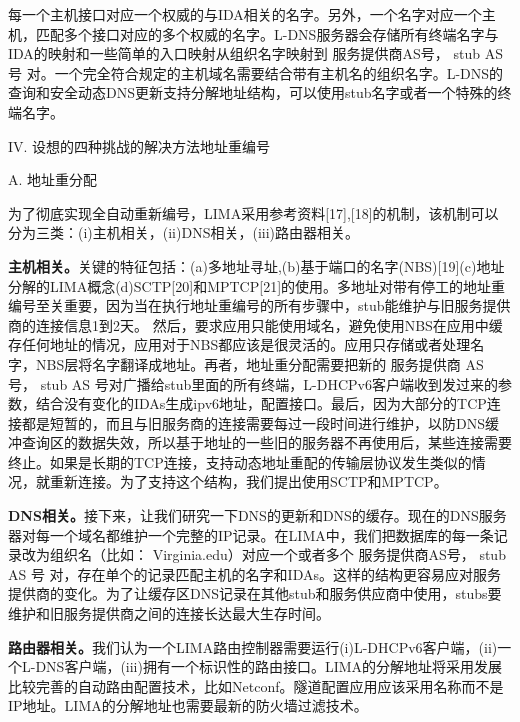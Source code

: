 \par 每一个主机接口对应一个权威的与IDA相关的名字。另外，一个名字对应一个主机，匹配多个接口对应的多个权威的名字。L-DNS服务器会存储所有终端名字与IDA的映射和一些简单的入口映射从组织名字映射到 { 服务提供商AS号， stub AS 号 }对。一个完全符合规定的主机域名需要结合带有主机名的组织名字。L-DNS的查询和安全动态DNS更新支持分解地址结构，可以使用stub名字或者一个特殊的终端名字。
\begin{center}
IV.	设想的四种挑战的解决方法地址重编号
\end{center}
\begin{flushleft}
A.	地址重分配 
\end{flushleft}
\par 为了彻底实现全自动重新编号，LIMA采用参考资料[17],[18]的机制，该机制可以分为三类：(i)主机相关，(ii)DNS相关，(iii)路由器相关。
\begin{flushleft}
\par \textbf{主机相关。}关键的特征包括：(a)多地址寻址,(b)基于端口的名字(NBS)[19](c)地址分解的LIMA概念(d)SCTP[20]和MPTCP[21]的使用。多地址对带有停工的地址重编号至关重要，因为当在执行地址重编号的所有步骤中，stub能维护与旧服务提供商的连接信息1到2天。 然后，要求应用只能使用域名，避免使用NBS在应用中缓存任何地址的情况，应用对于NBS都应该是很灵活的。应用只存储或者处理名字，NBS层将名字翻译成地址。再者，地址重分配需要把新的 { 服务提供商 AS 号， stub AS 号}对广播给stub里面的所有终端，L-DHCPv6客户端收到发过来的参数，结合没有变化的IDAs生成ipv6地址，配置接口。最后，因为大部分的TCP连接都是短暂的，而且与旧服务商的连接需要每过一段时间进行维护，以防DNS缓冲查询区的数据失效，所以基于地址的一些旧的服务器不再使用后，某些连接需要终止。如果是长期的TCP连接，支持动态地址重配的传输层协议发生类似的情况，就重新连接。为了支持这个结构，我们提出使用SCTP和MPTCP。

\par \textbf{DNS相关。}接下来，让我们研究一下DNS的更新和DNS的缓存。现在的DNS服务器对每一个域名都维护一个完整的IP记录。在LIMA中，我们把数据库的每一条记录改为组织名（比如： Virginia.edu）对应一个或者多个 { 服务提供商AS号， stub AS 号 } 对，存在单个的记录匹配主机的名字和IDAs。这样的结构更容易应对服务提供商的变化。为了让缓存区DNS记录在其他stub和服务供应商中使用，stubs要维护和旧服务提供商之间的连接长达最大生存时间。

\par \textbf{路由器相关。}我们认为一个LIMA路由控制器需要运行(i)L-DHCPv6客户端，(ii)一个L-DNS客户端，(iii)拥有一个标识性的路由接口。LIMA的分解地址将采用发展比较完善的自动路由配置技术，比如Netconf。隧道配置应用应该采用名称而不是IP地址。LIMA的分解地址也需要最新的防火墙过滤技术。
\end{flushleft}

